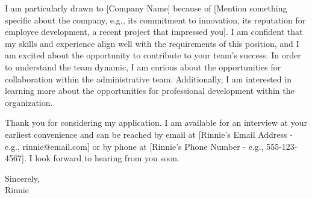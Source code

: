 \documentclass[letterpaper,11pt]{article}
\begin{document}
I am particularly drawn to [Company Name] because of [Mention something specific about the company, e.g., its commitment to innovation, its reputation for employee development, a recent project that impressed you]. I am confident that my skills and experience align well with the requirements of this position, and I am excited about the opportunity to contribute to your team's success. In order to understand the team dynamic, I am curious about the opportunities for collaboration within the administrative team. Additionally, I am interested in learning more about the opportunities for professional development within the organization.
\vspace{10pt}

Thank you for considering my application. I am available for an interview at your earliest convenience and can be reached by email at [Rinnie's Email Address - e.g., rinnie@email.com] or by phone at [Rinnie's Phone Number - e.g., 555-123-4567]. I look forward to hearing from you soon.
\vspace{20pt}

Sincerely, \\
\vspace{40pt} %
Rinnie
\end{document}
